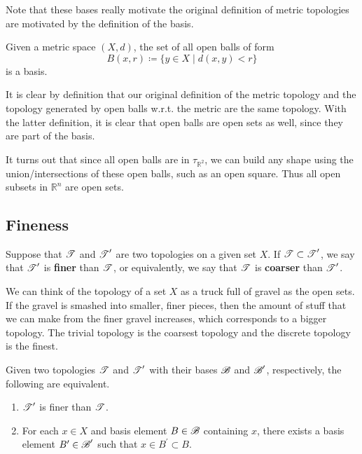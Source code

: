     Note that these bases really motivate the original definition of metric topologies are motivated by the definition of the basis.  

    \begin{theorem} 
      Given a metric space $(X, d)$, the set of all open balls of form 
      \begin{equation}
        B(x, r) \coloneqq \{y \in X \mid d(x, y) < r \}
      \end{equation} 
      is a basis. 
    \end{theorem} 

    It is clear by definition that our original definition of the metric topology and the topology generated by open balls w.r.t. the metric are the same topology. With the latter definition, it is clear that open balls are open sets as well, since they are part of the basis.  

    It turns out that since all open balls are in $\tau_{\mathbb{R}^{2}}$, we can build any shape using the union/intersections of these open balls, such as an open square. Thus all open subsets in $\mathbb{R}^{n}$ are open sets. 

  \subsection{Fineness}

      \begin{definition}
        Suppose that $\T$ and $\T^\prime$ are two topologies on a given set $X$. If $\T \subset \T^\prime$, we say that $\T^\prime$ is \textbf{finer} than $\T$, or equivalently, we say that $\T$ is \textbf{coarser} than $\T^\prime$. 
      \end{definition}

      We can think of the topology of a set $X$ as a truck full of gravel as the open sets. If the gravel is smashed into smaller, finer pieces, then the amount of stuff that we can make from the finer gravel increases, which corresponds to a bigger topology. The trivial topology is the coarsest topology and the discrete topology is the finest. 

      \begin{lemma}
        Given two topologies $\T$ and $\T^\prime$ with their bases $\B$ and $\B^\prime$, respectively, the following are equivalent. 
        \begin{enumerate}
          \item $\T^\prime$ is finer than $\T$. 
          \item For each $x \in X$ and basis element $B \in \B$ containing $x$, there exists a basis element $B^\prime \in \B^\prime$ such that $x \in B^\prime \subset B$. 
        \end{enumerate}
      \end{lemma}

